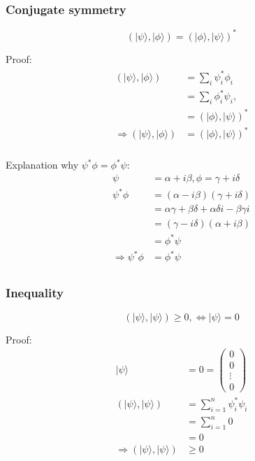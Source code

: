 \documentclass{article}
\begin{document}
\subsubsection{Conjugate symmetry}
\begin{equation}
    (|\psi\rangle,|\phi\rangle) = (|\phi\rangle,|\psi\rangle)^*
\end{equation}

Proof:
\begin{eqnarray}
    \begin{split}
        (|\psi\rangle,|\phi\rangle) & = \sum_{i}\psi_i^*\phi_i \\
        & = \sum_{i}\phi_i^*\psi_i, \\
        & = (|\phi\rangle,|\psi\rangle)^* \\
        \Longrightarrow (|\psi\rangle,|\phi\rangle) & = (|\phi\rangle,|\psi\rangle)^* \\
    \end{split}
\end{eqnarray}

Explanation why $\psi^*\phi = \phi^*\psi$:
\begin{equation}
    \begin{split}
        \psi & = \alpha + i\beta, \phi = \gamma + i\delta \\
        \psi^*\phi & = (\alpha - i\beta)(\gamma + i\delta) \\
        & = \alpha\gamma + \beta\delta + \alpha\delta i - \beta\gamma i \\
        & = (\gamma - i\delta)(\alpha + i\beta) \\
        & = \phi^*\psi \\
        \Longrightarrow \psi^*\phi & = \phi^*\psi \\
    \end{split}
\end{equation}

\subsubsection{Inequality}
\begin{equation}
    (|\psi\rangle,|\psi\rangle) \geq 0, \iff |\psi\rangle = 0
\end{equation}

Proof:
\begin{equation}
    \begin{split}
        |\psi\rangle & = 0 = \begin{pmatrix} 0 \\ 0 \\ \vdots \\ 0 \end{pmatrix} \\
        (|\psi\rangle,|\psi\rangle) & = \sum_{i=1}^{n}\psi_i^*\psi_i \\
        & = \sum_{i=1}^{n}0 \\
        & = 0 \\
        \Longrightarrow (|\psi\rangle,|\psi\rangle) & \geq 0 \\
    \end{split}
\end{equation}
\end{document}
